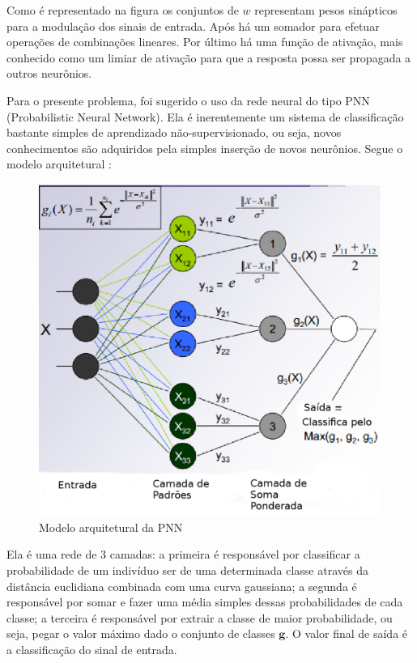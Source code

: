 Como é representado na figura os conjuntos de $w$ representam pesos sinápticos para a modulação dos sinais de entrada. Após há um somador para efetuar operações de combinações lineares. Por último há uma função de ativação, mais conhecido como um limiar de ativação para que a resposta possa ser propagada a outros neurônios.

\newpage
Para o presente problema, foi sugerido o uso da rede neural do tipo PNN (Probabilistic Neural Network). Ela é inerentemente um sistema de classificação bastante simples de aprendizado não-supervisionado, ou seja, novos conhecimentos são adquiridos pela simples inserção de novos neurônios. Segue o modelo arquitetural \cite{neuron-arq}:

\begin{figure}[h]
	\centering
		\includegraphics[scale=0.7]{figuras/PNN.eps}
	\caption{Modelo arquitetural da PNN}
\end{figure}

Ela é uma rede de 3 camadas: a primeira é responsável por classificar a probabilidade de um indivíduo ser de uma determinada classe através da distância euclidiana combinada com uma curva gaussiana; a segunda é responsável por somar e fazer uma média simples dessas probabilidades de cada classe; a terceira é responsável por extrair a classe de maior probabilidade, ou seja, pegar o valor máximo dado o conjunto de classes $\textbf{g}$. O valor final de saída é a classificação do sinal de entrada.
